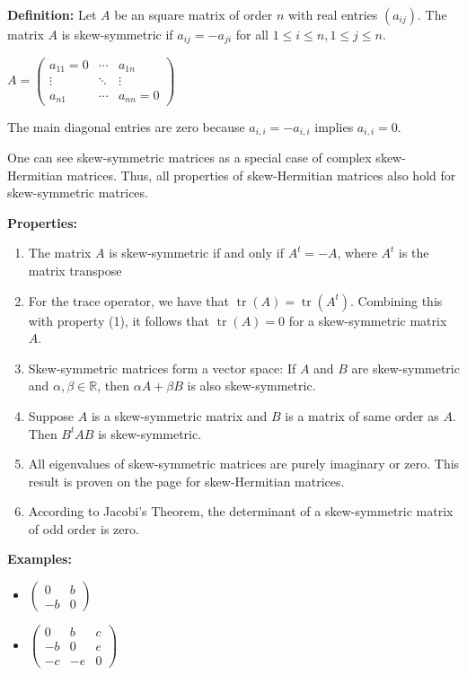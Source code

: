 \documentclass{article}
\begin{document}
\textbf{Definition:} \newline Let $A$ be an square matrix of
 order $n$ with real entries $(a_{ij})$. 
The matrix $A$ is skew-symmetric if $a_{ij} =
 -a_{ji}$ for all $1 \leq i \leq n, 1 \leq j \leq n$.
 \begin{center}$A =
 \begin{pmatrix}
  a_{11}=0 & \cdots & a_{1n} \\
  \vdots & \ddots & \vdots \\
  a_{n1} & \cdots & a_{nn}=0
 \end{pmatrix}$
 \end{center}
 The main diagonal entries are zero because 
$a_{i,i} = -a_{i,i}$ implies $a_{i,i} = 0$.

One can see skew-symmetric matrices as a
special case of  complex skew-Hermitian matrices. Thus, 
all properties of skew-Hermitian matrices also hold
for skew-symmetric matrices. 

 \textbf{Properties:}
 \begin{enumerate}
 \item The matrix $A$ is skew-symmetric if and only if 
$A^t = -A$, where $A^t$ is the matrix transpose
 \item For the trace operator, we have that 
$\operatorname{tr}(A) = \operatorname{tr}(A^t)$.
Combining this with property (1), it follows
that $ \operatorname{tr}(A)=0$ for a skew-symmetric matrix $A$.
 \item Skew-symmetric matrices form a vector space: If $A$ and $B$
are skew-symmetric and $\alpha, \beta\in \mathbb{R}$, then 
$\alpha A + \beta B$ is also skew-symmetric. 
 \item Suppose $A$ is a skew-symmetric matrix and $B$ is a matrix of
same order as $A$. Then $B^t A B$ is skew-symmetric.
\item All eigenvalues of skew-symmetric matrices are
purely imaginary or zero. This result is proven on the page
for skew-Hermitian matrices. 
\item According to Jacobi's Theorem, the determinant of a
skew-symmetric matrix of odd order is zero. 
 \end{enumerate}
 
\textbf{Examples:}
 \begin{itemize}
 \item $\begin{pmatrix}
  0 & b \\
  -b & 0
  \end{pmatrix}$
 \item $\begin{pmatrix}
  0 & b & c \\
  -b & 0 & e \\
  -c & -e & 0
  \end{pmatrix}$
 \end{itemize}
\end{document}
